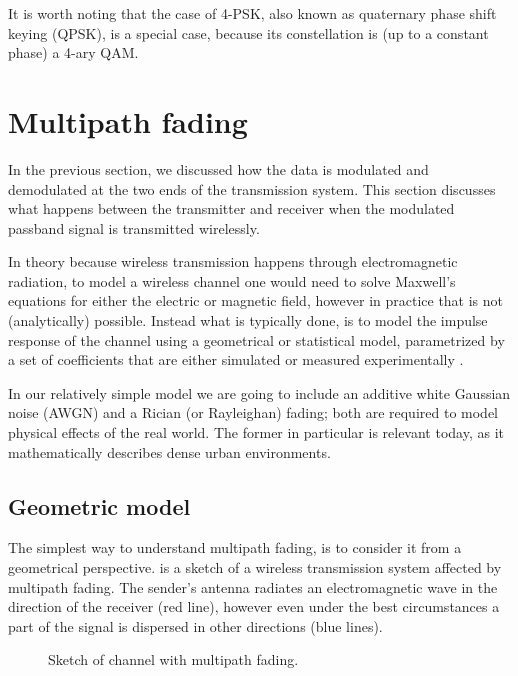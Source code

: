 It is worth noting that the case of 4-PSK, also known as quaternary phase shift keying (QPSK), is a special case, because its constellation is (up to a constant phase) a 4-ary QAM.

\section{Multipath fading} \label{sec:multipath-fading}

In the previous section, we discussed how the data is modulated and demodulated at the two ends of the transmission system. This section discusses what happens between the transmitter and receiver when the modulated passband signal is transmitted wirelessly.

In theory because wireless transmission happens through electromagnetic radiation, to model a wireless channel one would need to solve Maxwell's equations for either the electric or magnetic field, however in practice that is not (analytically) possible. Instead what is typically done, is to model the impulse response of the channel using a geometrical or statistical model, parametrized by a set of coefficients that are either simulated or measured experimentally \cite{Gallager}.

In our relatively simple model we are going to include an additive white Gaussian noise (AWGN) and a Rician (or Rayleighan) fading; both are required to model physical effects of the real world. The former in particular is relevant today, as it mathematically describes dense urban environments.

\subsection{Geometric model}

The simplest way to understand multipath fading, is to consider it from a geometrical perspective.  is a sketch of a wireless transmission system affected by multipath fading. The sender's antenna radiates an electromagnetic wave in the direction of the receiver (red line), however even under the best circumstances a part of the signal is dispersed in other directions (blue lines).

\begin{figure}
	\centering
	
	\caption{
		Sketch of channel with multipath fading.
		\label{fig:multipath-sketch}
	}
\end{figure}

